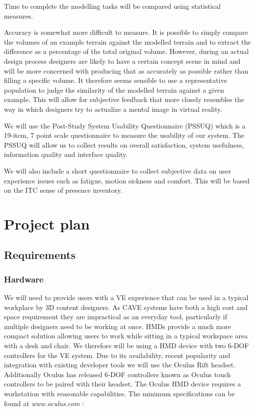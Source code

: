 \documentclass{sig-alternate-05-2015}
\begin{document}
Time to complete the modelling tasks will be compared using statistical measures.

Accuracy is somewhat more difficult to measure. It is possible to simply compare the volumes of an example terrain against the modelled terrain and to extract the difference as a percentage of the total original volume. However, during an actual design process designers are likely to have a certain concept scene in mind and will be more concerned with producing that as accurately as possible rather than filling a specific volume. It therefore seems sensible to use a representative population to judge the similarity of the modelled terrain against a given example. This will allow for subjective feedback that more closely resembles the way in which designers try to actualize a mental image in virtual reality.

We will use the Post-Study System Usability Questionnaire (PSSUQ) which is a 19-item, 7 point scale questionnaire\cite{Lewis1995} to measure the usability of our system. The PSSUQ will allow us to collect results on overall satisfaction, system usefulness, information quality and interface quality.

We will also include a short questionnaire to collect subjective data on user experience issues such as fatigue, motion sickness and comfort. This will be based on the ITC sense of presence inventory\cite{lessiter2001cross}.

\section{Project plan}
\subsection{Requirements}
\subsubsection{Hardware}
We will need to provide users with a VE experience that can be used in a typical workplace by 3D content designers. As CAVE systems have both a high cost and space requirement they are impractical as an everyday tool, particularly if multiple designers need to be working at once. HMDs provide a much more compact solution allowing users to work while sitting in a typical workspace area with a desk and chair. We therefore will be using a HMD device with two 6-DOF controllers for the VE system. Due to its availability, recent popularity and integration with existing developer tools we will use the Oculus Rift headset. Additionally Oculus has released 6-DOF controllers known as Oculus touch controllers to be paired with their headset\cite{Oculus}. The Oculus HMD device requires a workstation with reasonable capabilities. The minimum specifications can be found at \textit{www.oculus.com} \cite{Oculus}:
\end{document}
